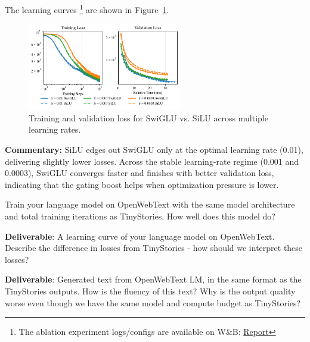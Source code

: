 \begin{answer}

The learning curves \footnote{The ablation experiment logs/configs are available on W\&B: \href{https://api.wandb.ai/links/donglinkang2021-beijing-institute-of-technology/c54zgdnw}{Report}} are shown in Figure~\ref{fig:swiglu_ablation}.

\begin{figure}[!htb]
    \centering
    \includegraphics[width=0.6\textwidth]{images/swiglu_ablation_experiments.pdf}
    \caption{Training and validation loss for SwiGLU vs. SiLU across multiple learning rates.}
    \label{fig:swiglu_ablation}
\end{figure}

\textbf{Commentary:} SiLU edges out SwiGLU only at the optimal learning rate (0.01), delivering slightly lower losses. Across the stable learning-rate regime (0.001 and 0.0003), SwiGLU converges faster and finishes with better validation loss, indicating that the gating boost helps when optimization pressure is lower.

\end{answer}


Train your language model on OpenWebText with the same model architecture and total training iterations as TinyStories. How well does this model do?

\textbf{Deliverable}: A learning curve of your language model on OpenWebText. Describe the difference in losses from TinyStories - how should we interpret these losses?

\textbf{Deliverable}: Generated text from OpenWebText LM, in the same format as the TinyStories outputs. How is the fluency of this text? Why is the output quality worse even though we have the same model and compute budget as TinyStories?

